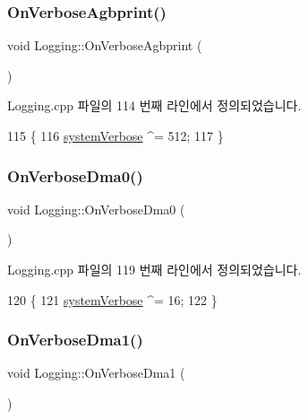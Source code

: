 \mbox{\label{class_logging_a2753a791376fbbf7afc759eda3c5f797}} 
\subsubsection{\texorpdfstring{On\+Verbose\+Agbprint()}{OnVerboseAgbprint()}}
{\footnotesize\ttfamily void Logging\+::\+On\+Verbose\+Agbprint (\begin{DoxyParamCaption}{ }\end{DoxyParamCaption})\hspace{0.3cm}{\ttfamily [protected]}}



Logging.\+cpp 파일의 114 번째 라인에서 정의되었습니다.


\begin{DoxyCode}
115 \{
116   \mbox{\hyperlink{system_8cpp_a67739df6b2271a8b807f01c50a610478}{systemVerbose}} ^= 512;
117 \}
\end{DoxyCode}
\mbox{\label{class_logging_a0b84d239efc2e8bb496a315804a41553}} 
\subsubsection{\texorpdfstring{On\+Verbose\+Dma0()}{OnVerboseDma0()}}
{\footnotesize\ttfamily void Logging\+::\+On\+Verbose\+Dma0 (\begin{DoxyParamCaption}{ }\end{DoxyParamCaption})\hspace{0.3cm}{\ttfamily [protected]}}



Logging.\+cpp 파일의 119 번째 라인에서 정의되었습니다.


\begin{DoxyCode}
120 \{
121   \mbox{\hyperlink{system_8cpp_a67739df6b2271a8b807f01c50a610478}{systemVerbose}} ^= 16;
122 \}
\end{DoxyCode}
\mbox{\label{class_logging_af1b9e807abdf717e20bf3cb7a3a39099}} 
\subsubsection{\texorpdfstring{On\+Verbose\+Dma1()}{OnVerboseDma1()}}
{\footnotesize\ttfamily void Logging\+::\+On\+Verbose\+Dma1 (\begin{DoxyParamCaption}{ }\end{DoxyParamCaption})\hspace{0.3cm}{\ttfamily [protected]}}



